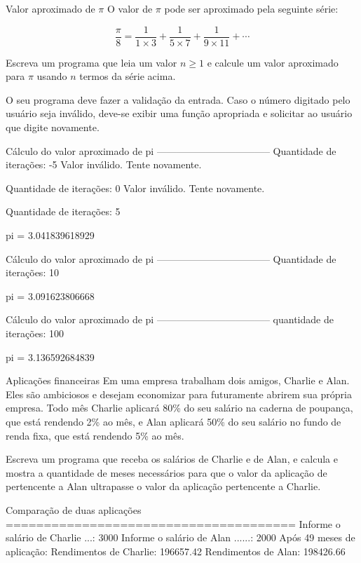 \documentclass[11pt,fleqn]{practice}
\begin{document}
\newpage
\begin{task}[breakable]{Valor aproximado de $\pi$}{}
  O valor de $\pi$ pode ser aproximado pela seguinte série:

  \[ \frac{\pi}{8} = \frac{1}{1 \times 3} +  \frac{1}{5 \times 7} +  \frac{1}{9 \times 11} + \cdots \]

  Escreva um programa que leia um valor $n \ge 1$ e calcule um valor
  aproximado para $\pi$ usando $n$ termos da série acima.
  
  O seu programa deve fazer a validação da entrada. Caso o número
  digitado pelo usuário seja inválido, deve-se exibir uma função
  apropriada e solicitar ao usuário que digite novamente.

  \begin{runexample}
Cálculo do valor aproximado de pi
-----------------------------------
Quantidade de iterações: -5
  Valor inválido. Tente novamente.

Quantidade de iterações: 0
  Valor inválido. Tente novamente.

Quantidade de iterações: 5

pi = 3.041839618929
  \end{runexample}

  \begin{runexample}
Cálculo do valor aproximado de pi
-----------------------------------
Quantidade de iterações: 10

pi = 3.091623806668
  \end{runexample}

  \begin{runexample}
Cálculo do valor aproximado de pi
-----------------------------------
quantidade de iterações: 100

pi = 3.136592684839
  \end{runexample}

  \tcblower
  \solution
\end{task}

\newpage
\begin{task}[breakable]{Aplicações financeiras}{}
  Em uma empresa trabalham dois amigos, Charlie e Alan. Eles são
  ambiciosos e desejam economizar para futuramente abrirem sua própria
  empresa. Todo mês Charlie aplicará 80\% do seu salário na caderna de
  poupança, que está rendendo 2\% ao mês, e Alan aplicará 50\% do seu
  salário no fundo de renda fixa, que está rendendo 5\% ao
  mês.

  Escreva um programa que receba os salários de Charlie e de Alan, e
  calcula e mostra a quantidade de meses necessários para que o valor da
  aplicação de pertencente a Alan ultrapasse o valor da aplicação
  pertencente a Charlie.

  \begin{runexample}
Comparação de duas aplicações
======================================
Informe o salário de Charlie ...: 3000
Informe o salário de Alan ......: 2000
Após 49 meses de aplicação:
Rendimentos de Charlie: 196657.42
Rendimentos de Alan: 198426.66
  \end{runexample}

  \tcblower
  \solution
\end{task}
\end{document}
